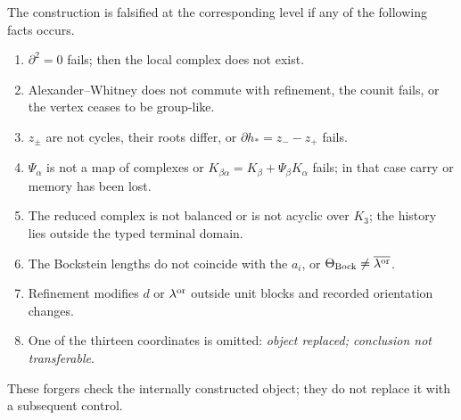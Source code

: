 \begin{ablation}
\label{abl:detint-falsadores}
The construction is falsified at the corresponding level if any of
the following facts occurs.
\begin{enumerate}
 \item \(\partial^2=0\) fails; then the local complex does not exist.
 \item Alexander--Whitney does not commute with refinement, the counit fails, or
 the vertex ceases to be group-like.
 \item \(z_\pm\) are not cycles, their roots differ, or
 \(\partial h_*=z_--z_+\) fails.
 \item \(\Psi_\alpha\) is not a map of complexes or
 \(K_{\beta\alpha}=K_\beta+\Psi_\beta K_\alpha\) fails; in that case
 carry or memory has been lost.
 \item The reduced complex is not balanced or is not acyclic over
 \(K_3\); the history lies outside the typed terminal domain.
 \item The Bockstein lengths do not coincide with the \(a_i\), or
 \(\Theta_{\rm Bock}\ne\overline{\lambda^{\rm or}}\).
 \item Refinement modifies \(d\) or \(\lambda^{\rm or}\) outside
 unit blocks and recorded orientation changes.
 \item One of the thirteen coordinates is omitted: \emph{object replaced;
 conclusion not transferable}.
\end{enumerate}
These forgers check the internally constructed object; they do not replace it with a subsequent control.
\end{ablation}
\fi
